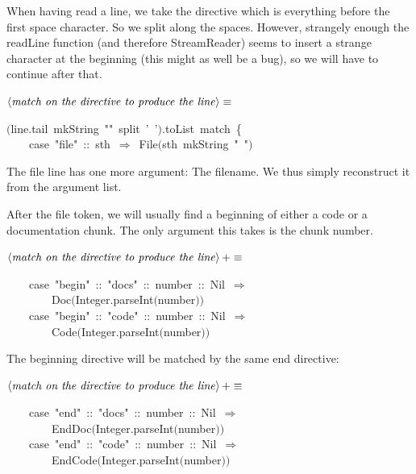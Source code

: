 \documentclass[a4paper,12pt]{article}
\begin{document}
When having read a line, we take the directive which is everything before
the first space character. So we split along the spaces. However, strangely
enough the readLine function (and therefore StreamReader) seems to insert
a strange character at the beginning (this might as well be a bug), so we will
have to continue after that.

$\left<\mbox{\emph{match on the directive to produce the line}}\right>\equiv$
\begin{program}$($line.tail~mkString~""~split~'~'$)$.toList~{\vem match}~{\small\{}
\\~~~~{\vem case}~"file"~{\rm :}{\rm :}~sth~$\Rightarrow$~File$($sth~mkString~"~"$)$
\\[0.5em]\end{program}


The file line has one more argument: The filename. We thus simply reconstruct
it from the argument list.

After the file token, we will usually find a beginning of either a code or
a documentation chunk. The only argument this takes is the chunk number.

$\left<\mbox{\emph{match on the directive to produce the line}}\right>+\equiv$
\begin{program}~~~~{\vem case}~"begin"~{\rm :}{\rm :}~"docs"~{\rm :}{\rm :}~number~{\rm :}{\rm :}~Nil~$\Rightarrow$
\\~~~~~~~~Doc$($Integer.parseInt$($number$)$$)$
\\~~~~{\vem case}~"begin"~{\rm :}{\rm :}~"code"~{\rm :}{\rm :}~number~{\rm :}{\rm :}~Nil~$\Rightarrow$
\\~~~~~~~~Code$($Integer.parseInt$($number$)$$)$
\\[0.5em]\end{program}


The beginning directive will be matched by the same end directive:

$\left<\mbox{\emph{match on the directive to produce the line}}\right>+\equiv$
\begin{program}~~~~{\vem case}~"end"~{\rm :}{\rm :}~"docs"~{\rm :}{\rm :}~number~{\rm :}{\rm :}~Nil~$\Rightarrow$
\\~~~~~~~~EndDoc$($Integer.parseInt$($number$)$$)$
\\~~~~{\vem case}~"end"~{\rm :}{\rm :}~"code"~{\rm :}{\rm :}~number~{\rm :}{\rm :}~Nil~$\Rightarrow$
\\~~~~~~~~EndCode$($Integer.parseInt$($number$)$$)$
\\[0.5em]\end{program}
\end{document}
